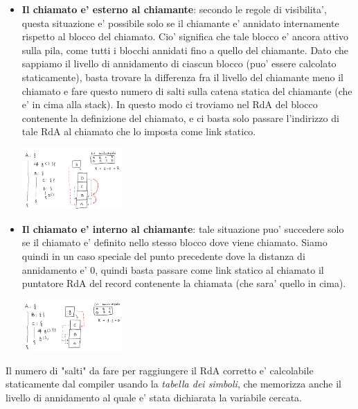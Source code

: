 \begin{itemize} \label{calcoloCatenaStatica}
  \item \textbf{Il chiamato e' esterno al chiamante}: secondo le regole di visibilita', questa situazione e' possibile solo se il chiamante e' annidato internamente rispetto al blocco del chiamato. Cio' significa che tale blocco e' ancora attivo sulla pila, come tutti i blocchi annidati fino a quello del chiamante. Dato che sappiamo il livello di annidamento di ciascun blocco (puo' essere calcolato staticamente), basta trovare la differenza fra il livello del chiamante meno il chiamato e fare questo numero di salti sulla catena statica del chiamante (che e' in cima alla stack). In questo modo ci troviamo nel RdA del blocco contenente la definizione del chiamato, e ci basta solo passare l'indirizzo di tale RdA al chiamato che lo imposta come link statico.
    \begin{center}
      \includegraphics[width=0.3\textwidth]{img/2025-03-06-14-23-08.png}
    \end{center}
  \item \textbf{Il chiamato e' interno al chiamante}: tale situazione puo' succedere solo se il chiamato e' definito nello stesso blocco dove viene chiamato. Siamo quindi in un caso speciale del punto precedente dove la distanza di annidamento e' 0, quindi basta passare come link statico al chiamato il puntatore RdA del record contenente la chiamata (che sara' quello in cima).
    \begin{center}
      \includegraphics[width=0.3\textwidth]{img/2025-03-06-14-26-54.png}
    \end{center}
\end{itemize}

Il numero di "salti" da fare per raggiungere il RdA corretto e' calcolabile staticamente dal compiler usando la \textit{tabella dei simboli}, che memorizza anche il livello di annidamento al quale e' stata dichiarata la variabile cercata. 

